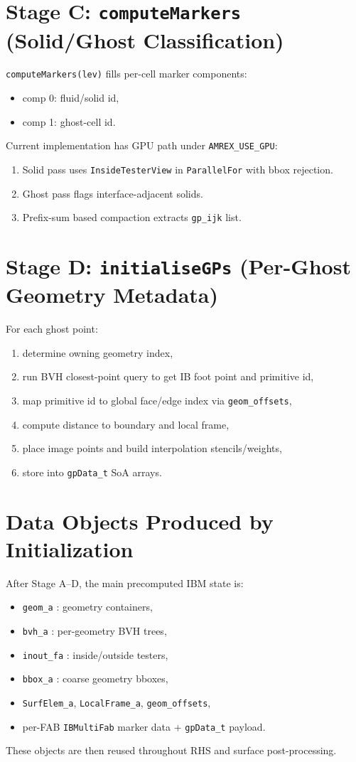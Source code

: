 \documentclass[11pt,a4paper]{article}
\begin{document}
\section{Stage C: \texttt{computeMarkers} (Solid/Ghost Classification)}

\texttt{computeMarkers(lev)} fills per-cell marker components:
\begin{itemize}[nosep]
  \item comp 0: fluid/solid id,
  \item comp 1: ghost-cell id.
\end{itemize}

Current implementation has GPU path under \texttt{AMREX\_USE\_GPU}:
\begin{enumerate}[nosep]
  \item Solid pass uses \texttt{InsideTesterView} in \texttt{ParallelFor}
        with bbox rejection.
  \item Ghost pass flags interface-adjacent solids.
  \item Prefix-sum based compaction extracts \texttt{gp\_ijk} list.
\end{enumerate}

\section{Stage D: \texttt{initialiseGPs} (Per-Ghost Geometry Metadata)}

For each ghost point:
\begin{enumerate}[nosep]
  \item determine owning geometry index,
  \item run BVH closest-point query to get IB foot point and primitive id,
  \item map primitive id to global face/edge index via \texttt{geom\_offsets},
  \item compute distance to boundary and local frame,
  \item place image points and build interpolation stencils/weights,
  \item store into \texttt{gpData\_t} SoA arrays.
\end{enumerate}

\section{Data Objects Produced by Initialization}

After Stage A--D, the main precomputed IBM state is:
\begin{itemize}[nosep]
  \item \texttt{geom\_a} : geometry containers,
  \item \texttt{bvh\_a} : per-geometry BVH trees,
  \item \texttt{inout\_fa} : inside/outside testers,
  \item \texttt{bbox\_a} : coarse geometry bboxes,
  \item \texttt{SurfElem\_a}, \texttt{LocalFrame\_a}, \texttt{geom\_offsets},
  \item per-FAB \texttt{IBMultiFab} marker data + \texttt{gpData\_t} payload.
\end{itemize}

These objects are then reused throughout RHS and surface post-processing.
\end{document}
